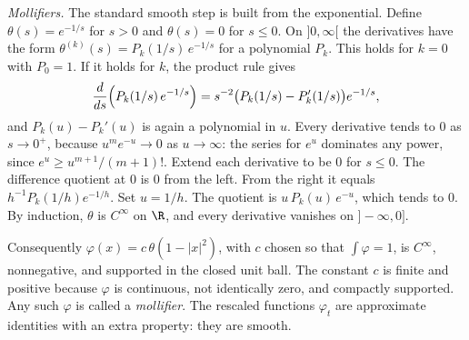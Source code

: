\emph{Mollifiers.} The standard smooth step is built from the exponential. Define $\theta(s)=e^{-1/s}$ for $s>0$ and $\theta(s)=0$ for $s\le0$. On $]0,\infty[$ the derivatives have the form $\theta^{(k)}(s)=P_k(1/s)\,e^{-1/s}$ for a polynomial $P_k$. This holds for $k=0$ with $P_0=1$. If it holds for $k$, the product rule gives
\[\frac{d}{ds}\Bigl(P_k(1/s)\,e^{-1/s}\Bigr)=s^{-2}\bigl(P_k(1/s)-P_k'(1/s)\bigr)e^{-1/s},\]
and $P_k(u)-P_k'(u)$ is again a polynomial in $u$. Every derivative tends to $0$ as $s\to0^+$, because $u^m e^{-u}\to0$ as $u\to\infty$: the series for $e^u$ dominates any power, since $e^u\ge u^{m+1}/(m+1)!$. Extend each derivative to be $0$ for $s\le0$. The difference quotient at $0$ is $0$ from the left. From the right it equals $h^{-1}P_k(1/h)e^{-1/h}$. Set $u=1/h$. The quotient is $u\,P_k(u)\,e^{-u}$, which tends to $0$. By induction, $\theta$ is $C^\infty$ on $\R$, and every derivative vanishes on $]-\infty,0]$.

Consequently $\varphi(x)=c\,\theta(1-|x|^2)$, with $c$ chosen so that $\int\varphi=1$, is $C^\infty$, nonnegative, and supported in the closed unit ball. The constant $c$ is finite and positive because $\varphi$ is continuous, not identically zero, and compactly supported. Any such $\varphi$ is called a \emph{mollifier}. The rescaled functions $\varphi_t$ are approximate identities with an extra property: they are smooth.

